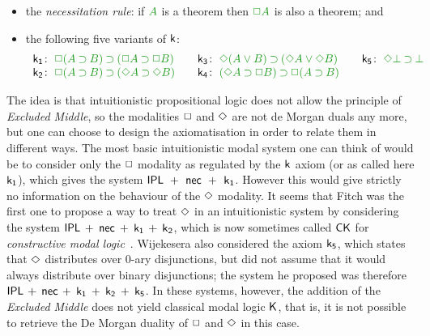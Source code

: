 \documentclass[a4paper]{article}
\begin{document}
 \begin{itemize}
 	\item the \emph{necessitation rule}: if $\fm A$ is a theorem then $\fm{\BOX A}$ is also a theorem; and
 	\item the following five variants of $\rn{k}$:
 	\begin{equation*}
 		\label{eq:ik}%
 		\begin{array}[t]{r@{\;}l@{\qquad}r@{\;}l@{\qquad}r@{\;}l}
 			\kax[1]\colon&\fm{\BOX(A\IMP B)\IMP(\BOX A\IMP\BOX B)}
 			&
 			\kax[3]\colon&\fm{\DIA(A\OR B)\IMP(\DIA A\OR\DIA B)}
 			&
 			\kax[5]\colon&\fm{\DIA\BOT\IMP\BOT}
 			\\
 			\kax[2]\colon&\fm{\BOX(A\IMP B)\IMP(\DIA A\IMP\DIA B)}
 			&
 			\kax[4]\colon&\fm{(\DIA A\IMP \BOX B)\IMP\BOX(A\IMP B)}\\%
 		\end{array}
 	\end{equation*}
 \end{itemize}
 
 The idea is that intuitionistic propositional logic does not allow the principle of \emph{Excluded Middle}, so the modalities $\BOX$ and $\DIA$ are not de Morgan duals any more, but one can choose to design the axiomatisation in order to relate them in different ways. The most basic intuitionistic modal system one can think of would be to consider only the $\BOX$ modality as regulated by the $\kax$ axiom (or as called here $\kax[1]$), which gives the system \hbox{$\rn{IPL}$ $\rn{+}$ $\rn{nec}$ $\rn{+}$ $\kax[1]$}. However this would give strictly no information on the behaviour of the $\DIA$ modality.
 It seems that Fitch \cite{fitch:pm48} was the first one to propose a way to treat $\DIA$ in an intuitionistic system by considering the system  $\rn{IPL}$ $\rn{+}$ $\rn{nec}$ $\rn{+}$ $\kax[1]$ $\rn{+}$ $\kax[2]$, which is now sometimes called $\rn{CK}$ for \emph{constructive modal logic}~\cite{bierman:depaiva:sl00,mendler:scheele:ic11}. Wijekesera \cite{wijesekera:apal90} also considered the axiom $\kax[5]$, which states that $\DIA$ distributes over 0-ary disjunctions, but did not assume that it would always distribute over binary disjunctions; the system he proposed was therefore  $\rn{IPL}$ $\rn{+}$ $\rn{nec}$ $\rn{+}$ $\kax[1]$ $\rn{+}$ $\kax[2]$  $\rn{+}$ $\kax[5]$. In these systems, however, the addition of the \emph{Excluded Middle} does not yield classical modal logic $\K$, that is, it is not possible to retrieve the De Morgan duality of $\BOX$ and $\DIA$ in this case.
 
\end{document}
